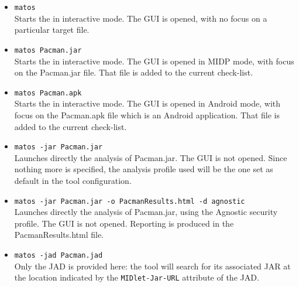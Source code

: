 \begin{itemize}
\item{\texttt{matos}}\\ 
Starts the \ma in interactive mode. The GUI is opened, with no focus
on a particular target file.
\item{\texttt{matos Pacman.jar}}\\
Starts the \ma in interactive mode. The GUI is opened in MIDP mode, with focus
on the Pacman.jar file. That file is added to the current check-list.
\item{\texttt{matos Pacman.apk}}\\
Starts the \ma in interactive mode. The GUI is opened in Android mode, with
focus on the Pacman.apk file which is an Android application. 
That file is added to the current check-list.
\item{\texttt{matos -jar Pacman.jar}}\\
Launches directly the analysis of Pacman.jar. The GUI is not opened. Since nothing more is
specified, the analysis profile used will be the one set as default in
the tool configuration. 
\item{\texttt{matos -jar Pacman.jar -o PacmanResults.html -d
    agnostic}}\\
Launches directly the analysis of Pacman.jar, using the Agnostic
security profile. The GUI is not opened. Reporting is produced in the PacmanResults.html
file.
\item{\texttt{matos -jad Pacman.jad}}\\
Only the JAD is provided here: the tool will search for its associated
JAR at the location indicated by the \texttt{MIDlet-Jar-URL} attribute
of the JAD.
\end{itemize}

